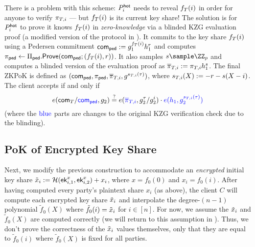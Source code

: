 There is a problem with this scheme: $P_i^{\mathsf{hot}}$ needs to reveal $f_{T}(i)$ in order for anyone to verify $\pi_{T,i}$ --- but $f_{T}(i)$ is its current key share! The solution is for $P_i^{\mathsf{hot}}$ to prove it knows $f_{T}(i)$ in \emph{zero-knowledge} via a blinded KZG evaluation proof (a modified version of the protocol in \cite[\S6.1]{CCS:ZBKMNS22}).
It commits to the key share $f_{T}(i)$ using a Pedersen commitment $\mathsf{com}_{\sf ped} := g_1^{f_{T}(i)} h_1^r$
and computes $\pi_{\sf ped} \gets \Pi_{\sf ped}.\mathsf{Prove}(\mathsf{com}_{\sf ped}; (f_{T}(i), r))$. 
It also samples $s \sample \ZZ_p$ and computes a blinded version of the evaluation proof as $\overline{\pi}_{T,i} := \pi_{T,i} h_1^s$.
The final ZKPoK is defined as $(\mathsf{com}_{\sf ped}, \pi_{\sf ped}, \overline{\pi}_{T,i}, g^{s_{T,i}(\tau)})$, where $s_{T,i}(X) := -r - s(X-i)$. The client accepts if and only if 
\[
    e(\mathsf{com}_{T}/\textcolor{blue}{\mathsf{com}_{\sf ped}}, g_2)
    \stackrel{?}{=}
    e(\textcolor{blue}{\overline{\pi}_{T,i}}, g_2^\tau/g_2^i) \cdot \textcolor{blue}{e(h_1, g_2^{s_{T,i}(\tau)})} 
\]
(where the $\textcolor{blue}{\text{blue}}$ parts are changes to the original KZG verification check due to the blinding).

\subsection{PoK of Encrypted Key Share}\label{subsec:enc_pok}

Next, we modify the previous construction to accommodate an \emph{encrypted} initial key share $\tilde{x}_i := \mathcal{H}(\mathsf{ek}_{i,1}^x, \mathsf{ek}_{i,2}^x) + x_i$, where $x = f_0(0)$ and $x_i = f_0(i)$. After having computed every party's plaintext share $x_i$ (as above), the client $C$ will compute each encrypted key share $\tilde{x}_i$ and interpolate the degree-$(n-1)$ polynomial $\tilde{f}_0(X)$ where $\tilde{f}_0(i) = \tilde{x}_i$ for $i \in [n]$. 
For now, we assume the $\tilde{x}_i$ and $\tilde{f}_0(X)$ are computed correctly (we will return to this assumption in ). Thus, we don't prove the correctness of the $\tilde{x}_i$ values themselves, only that they are equal to $\tilde{f}_0(i)$ where $\tilde{f}_0(X)$ is fixed for all parties.

